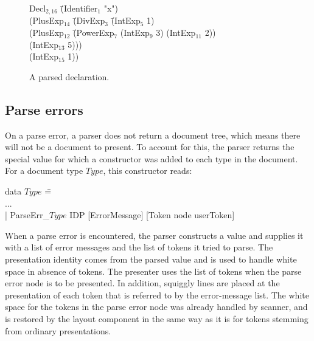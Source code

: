 \documentclass[12pt]{article}
\begin{document}
\begin{figure}
\begin{center}
\begin{footnotesize}
\begin{tabbedCode}
Decl$_{2,16}$ \= (Identifier$_1$ "x")\\ 
              \> (PlusExp$_{14}$ \= (DivExp$_3$ \= (IntExp$_5$ 1) \\
              \>                 \>             \> (PlusExp$_{12}$ \= (PowerExp$_7$ (IntExp$_9$ 3) (IntExp$_{11}$ 2))\\
              \>                 \>             \>                 \> (IntExp$_{13}$ 5)))\\
              \>                 \>(IntExp$_{15}$ 1))
\end{tabbedCode}
\end{footnotesize}
\end{center}
\caption{A parsed declaration.} \label{fig:parseResult} 
\end{figure}

\subsection{Parse errors} \label{sect:parseScanErrors}

On a parse error, a parser does not return a document tree, which means there will not be a document to present. To account for this, the parser returns the special value for which a constructor was added to each type in the document. For a document type $Type$, this constructor reads:

\begin{footnotesize}
\begin{tabbedCode}
data $Type$ \= =\\
            \> ...\\
            \> | ParseErr\_$Type$ IDP [ErrorMessage] [Token node userToken] 
\end{tabbedCode}
\end{footnotesize}

When a parse error is encountered, the parser constructs a  value and supplies it with a list of error messages and the list of tokens it tried to parse. The presentation identity comes from the parsed  value and is used to handle white space in absence of tokens. The presenter uses the list of tokens when the parse error node is to be presented. In addition, squiggly lines are placed at the presentation of each token that is referred to by the error-message list. The white space for the tokens in the parse error node was already handled by scanner, and is restored by the layout component in the same way as it is for tokens stemming from ordinary presentations.
\end{document}
